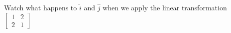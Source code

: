 \documentclass[preview]{standalone}
\begin{document}
\begin{minipage}
{8cm}Watch what happens to $\hat{i}$ and $\hat{j}$ when we apply the linear transformation $\begin{bmatrix}1 & 2\\ 2 & 1\end{bmatrix}$
\end{minipage}
\end{document}
